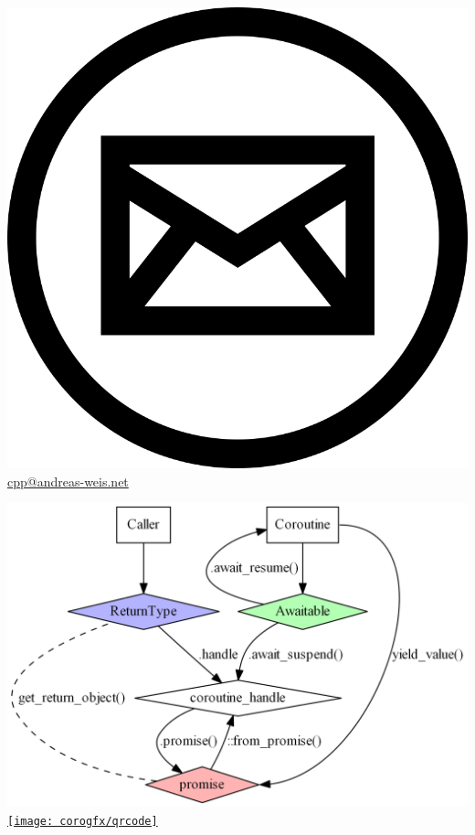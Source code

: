 \documentclass[aspectratio=169]{beamer}
\begin{document}
\begin{frame}
  \href{mailto:cpp@andreas-weis.net}{\includegraphics[height=.06\textheight]{resources/email-icon.png} cpp@andreas-weis.net}

\vspace{20pt}

\begin{center}
  \includegraphics[height=.6\textheight]{corogfx/acquaintances05.png}
  \hspace{12ex}
  \href{https://github.com/ComicSansMS/cpp20_coroutine_cheat_sheet}{\texttt{[image: corogfx/qrcode]}}
\end{center}

\end{frame}
\end{document}
